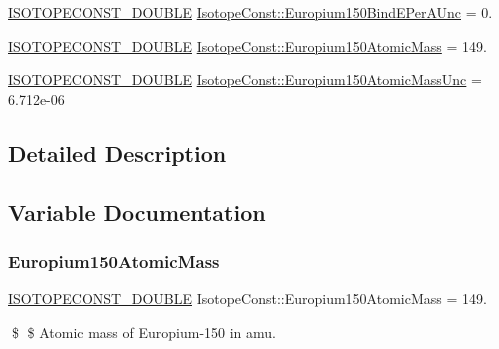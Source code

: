 \begin{DoxyCompactItemize}
\mbox{\hyperlink{group___isotope_const-_macros_ga8f45a7272ce02c0b4c65c44636ed719a}{I\+S\+O\+T\+O\+P\+E\+C\+O\+N\+S\+T\+\_\+\+D\+O\+U\+B\+LE}} \mbox{\hyperlink{group___isotope_const-_europium-_eu150_gabaa0ddad860f2ac3d32d557bc1c9c9cb}{Isotope\+Const\+::\+Europium150\+Bind\+E\+Per\+A\+Unc}} = 0.
\item 
\mbox{\hyperlink{group___isotope_const-_macros_ga8f45a7272ce02c0b4c65c44636ed719a}{I\+S\+O\+T\+O\+P\+E\+C\+O\+N\+S\+T\+\_\+\+D\+O\+U\+B\+LE}} \mbox{\hyperlink{group___isotope_const-_europium-_eu150_ga978c055b03ec3b387a0515c7ee0f95f2}{Isotope\+Const\+::\+Europium150\+Atomic\+Mass}} = 149.
\item 
\mbox{\hyperlink{group___isotope_const-_macros_ga8f45a7272ce02c0b4c65c44636ed719a}{I\+S\+O\+T\+O\+P\+E\+C\+O\+N\+S\+T\+\_\+\+D\+O\+U\+B\+LE}} \mbox{\hyperlink{group___isotope_const-_europium-_eu150_ga86563592ed1c006464c5564b95541443}{Isotope\+Const\+::\+Europium150\+Atomic\+Mass\+Unc}} = 6.\+712e-\/06
\end{DoxyCompactItemize}


\subsection{Detailed Description}


\subsection{Variable Documentation}
\mbox{\label{group___isotope_const-_europium-_eu150_ga978c055b03ec3b387a0515c7ee0f95f2}} 
\subsubsection{\texorpdfstring{Europium150\+Atomic\+Mass}{Europium150AtomicMass}}
{\footnotesize\ttfamily \mbox{\hyperlink{group___isotope_const-_macros_ga8f45a7272ce02c0b4c65c44636ed719a}{I\+S\+O\+T\+O\+P\+E\+C\+O\+N\+S\+T\+\_\+\+D\+O\+U\+B\+LE}} Isotope\+Const\+::\+Europium150\+Atomic\+Mass = 149.}

\$ \$ Atomic mass of Europium-\/150 in amu. \mbox{\label{group___isotope_const-_europium-_eu150_ga86563592ed1c006464c5564b95541443}} 
